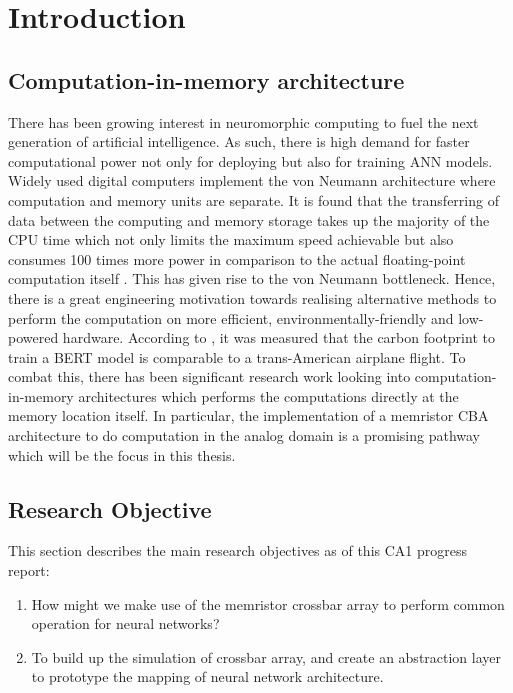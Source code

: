 
\chapter{Introduction}
\label{ch:introduction}

\vspace{2em}

\section{Computation-in-memory architecture}

There has been growing interest in neuromorphic computing to fuel the next generation of artificial intelligence. As such, there is high demand for faster computational power not only for deploying but also for training \ac{ANN} models. Widely used digital computers implement the von Neumann architecture where computation and memory units are separate. It is found that the transferring of data between the computing and memory storage takes up the majority of the \acs{CPU} time which not only limits the maximum speed achievable but also consumes 100 times more power in comparison to the actual floating-point computation itself \cite{Zou_Xu_Chen_Yan_Han_2021}. This has given rise to the von Neumann bottleneck. Hence, there is a great engineering motivation towards realising alternative methods to perform the computation on more efficient, environmentally-friendly and low-powered hardware. According to \citet{Strubell_Ganesh_McCallum_2019} \cite{Strubell_Ganesh_McCallum_2019}, it was measured that the carbon footprint to train a \acs{BERT} model is comparable to a trans-American airplane flight. To combat this, there has been significant research work looking into computation-in-memory architectures which performs the computations directly at the memory location itself. In particular, the implementation of a memristor \ac{CBA} architecture to do computation in the analog domain is a promising pathway which will be the focus in this thesis.

\newpage

\section{Research Objective}

This section describes the main research objectives as of this CA1 progress report:

\begin{enumerate}
  \item How might we make use of the memristor crossbar array to perform common operation for neural networks?
  \item To build up the simulation of crossbar array, and create an abstraction layer to prototype the mapping of neural network architecture.
\end{enumerate}

